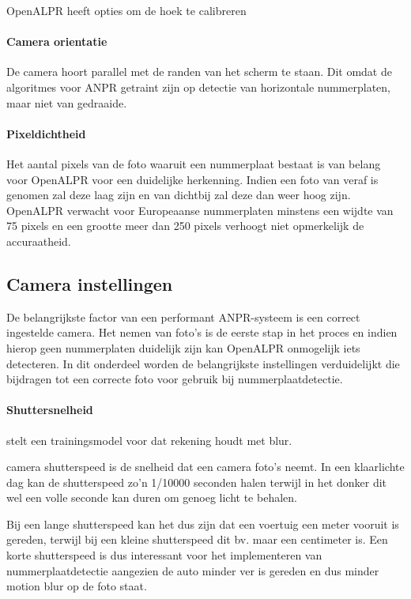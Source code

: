 OpenALPR heeft opties om de hoek te calibreren \autocite{openalprdocumentation}

\paragraph{Camera orientatie}
De camera hoort parallel met de randen van het scherm te staan. Dit omdat de algoritmes voor ANPR getraint zijn op detectie van horizontale nummerplaten, maar niet van gedraaide.

\paragraph{Pixeldichtheid}
Het aantal pixels van de foto waaruit een nummerplaat bestaat is van belang voor OpenALPR voor een duidelijke herkenning. Indien een foto van veraf is genomen zal deze laag zijn en van dichtbij zal deze dan weer hoog zijn. OpenALPR verwacht voor Europeaanse nummerplaten minstens een wijdte van 75 pixels en een grootte meer dan 250 pixels verhoogt niet opmerkelijk de accuraatheid. \autocite{openalprcameraplacement}

\subsection{Camera instellingen}
De belangrijkste factor van een performant ANPR-systeem is een correct ingestelde camera. Het nemen van foto's is de eerste stap in het proces en indien hierop geen nummerplaten duidelijk zijn kan OpenALPR onmogelijk iets detecteren. In dit onderdeel worden de belangrijkste instellingen verduidelijkt die bijdragen tot een correcte foto voor gebruik bij nummerplaatdetectie.

\paragraph{Shuttersnelheid}
\textcite{guo2017vehicle} stelt een trainingsmodel voor dat rekening houdt met blur.

camera shutterspeed is de snelheid dat een camera foto's neemt. In een klaarlichte dag kan de shutterspeed zo'n 1/10000 seconden halen terwijl in het donker dit wel een volle seconde kan duren om genoeg licht te behalen. \autocite{openalprcameraplacement}

Bij een lange shutterspeed kan het dus zijn dat een voertuig een meter vooruit is gereden, terwijl bij een kleine shutterspeed dit bv. maar een centimeter is. Een korte shutterspeed is dus interessant voor het implementeren van nummerplaatdetectie aangezien de auto minder ver is gereden en dus minder motion blur op de foto staat.

